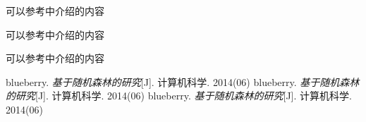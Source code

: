\documentclass[8pt]{article}
\begin{document}
	
	
	可以参考\cite{article1}中介绍的内容
	
	可以参考\cite{article2}中介绍的内容
	
	可以参考\cite{article3}中介绍的内容
	
	\begin{thebibliography}{100}
		 blueberry. \emph{基于随机森林的研究}[J]. 计算机科学. 2014(06)
		 blueberry. \emph{基于随机森林的研究}[J]. 计算机科学. 2014(06)
		 blueberry. \emph{基于随机森林的研究}[J]. 计算机科学. 2014(06)				
	\end{thebibliography}
	
	
	
	
	
	
	
	
	
	
	
	
	
	
\end{document}
